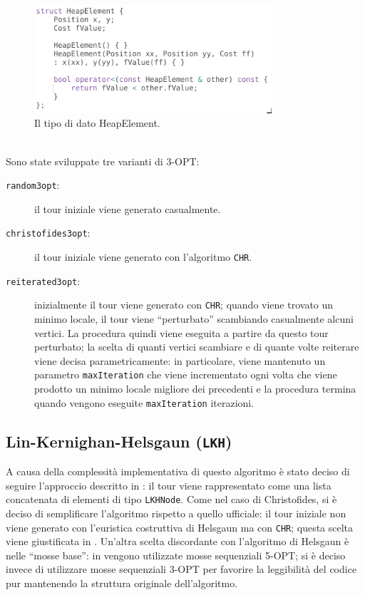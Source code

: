 \begin{figure}[H]
    \centering
    \includegraphics[width=250pt]{img/HeapElement.png}
    \caption{Il tipo di dato HeapElement.}
\end{figure}
\ \\
Sono state sviluppate tre varianti di 3-OPT:
\begin{description}
    \item[\texttt{random3opt}:] il tour iniziale viene generato casualmente.
    \item[\texttt{christofides3opt}:] il tour iniziale viene generato con l'algoritmo \texttt{CHR}.
    \item[\texttt{reiterated3opt}:] inizialmente il tour viene generato con \texttt{CHR}; quando viene 
            trovato un minimo locale, il tour viene ``perturbato'' scambiando casualmente alcuni vertici.
            La procedura quindi viene eseguita a partire da questo tour perturbato; la scelta di quanti 
            vertici scambiare e di quante volte reiterare viene decisa parametricamente: in particolare,
            viene mantenuto un parametro \texttt{maxIteration} che viene incrementato ogni volta che 
            viene prodotto un minimo locale migliore dei precedenti e la procedura termina quando vengono 
            eseguite \texttt{maxIteration} iterazioni.   
\end{description}

\subsection{Lin-Kernighan-Helsgaun (\texttt{LKH})}

A causa della complessità implementativa di questo algoritmo è stato deciso di seguire l'approccio 
descritto in \cite{LKH}: il tour viene rappresentato come una lista concatenata di elementi di tipo 
\texttt{LKHNode}. Come nel caso di Christofides, si è deciso di semplificare l'algoritmo rispetto a quello 
ufficiale: il tour iniziale non viene generato con l'euristica costruttiva di 
Helsgaun ma con \texttt{CHR}; questa scelta viene giustificata in \cite{LKH}. Un'altra scelta 
discordante con l'algoritmo di Helsgaun è nelle ``mosse base'': in \cite{LKH} vengono utilizzate mosse 
sequenziali 5-OPT; si è deciso invece di utilizzare mosse sequenziali 3-OPT per favorire la leggibilità 
del codice pur mantenendo la struttura originale dell'algoritmo. 

